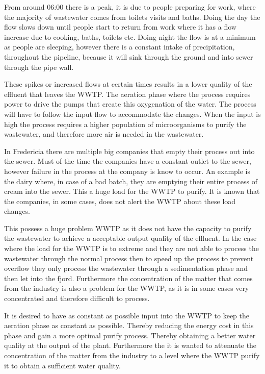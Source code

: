 From around 06:00 there is a peak, it is due to people preparing for work, where the majority of wastewater comes from toilets visits and baths. Doing the day the flow slows down until people start to return from work where it has a flow increase due to cooking, baths, toilets etc. Doing night the flow is at a minimum as people are sleeping, however there is a constant intake of precipitation, throughout the pipeline, because it will sink through the ground and into sewer through the pipe wall.  

These spikes or increased flows at certain times results in a lower quality of the effluent that leaves the WWTP. The aeration phase where the process requires power to drive the pumps that create this oxygenation of the water. The process will have to follow the input flow to accommodate the changes. When the input is high the process requires a higher population of microorganisms to purify the wastewater, and therefore more air is needed in the wastewater. 

In Fredericia there are multiple big companies that empty their process out into the sewer. Must of the time the companies have a constant outlet to the sewer, however failure in the process at the company is know to occur. An example is the dairy where, in case of a bad batch, they are emptying their entire process of cream into the sewer. This a huge load for the WWTP to purify. It is known that the companies, in some cases, does not alert the WWTP about these load changes. 

This possess a huge problem WWTP as it does not have the capacity to purify the wastewater to achieve a acceptable output quality of the effluent. In the case where the load for the WWTP is to extreme and they are not able to process the wastewater through the normal process then to speed up the process to prevent overflow they only process the wastewater through a sedimentation phase and then let into the fjord. Furthermore the concentration of the matter that comes from the industry is also a problem for the WWTP, as it is in some cases very concentrated and therefore difficult to process.  

It is desired to have as constant as possible input into the WWTP to keep the aeration phase as constant as possible. Thereby reducing the energy cost in this phase and gain a more optimal purify process. Thereby obtaining a better water quality at the output of the plant. Furthermore the it is wanted to attenuate the concentration of the matter from the industry to a level where the WWTP purify it to obtain a sufficient water quality. 

